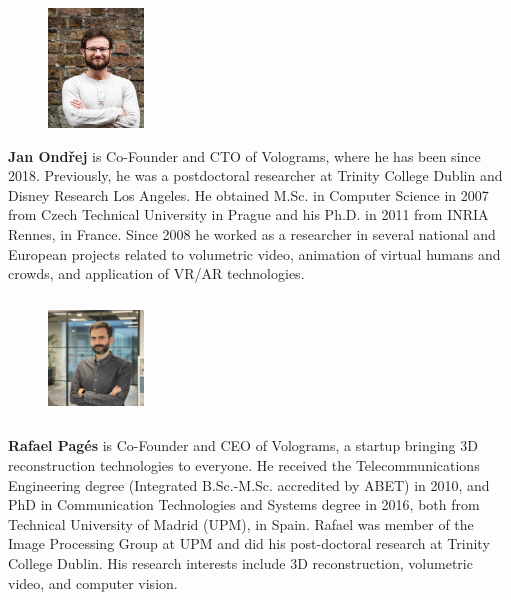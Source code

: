 \setlength\intextsep{0pt} %
\begin{figure} 
    \includegraphics[width=1in,height=1.25in,clip,keepaspectratio]{illustrations/photo_jan.jpg}
\end{figure}\par
\noindent \textbf{Jan Ondřej} is Co-Founder and CTO of Volograms, where he has been since 2018. Previously, he was a postdoctoral researcher at Trinity College Dublin and Disney Research Los Angeles. He obtained M.Sc. in Computer Science in 2007 from Czech Technical University in Prague and his Ph.D. in 2011 from INRIA Rennes, in France. Since 2008 he worked as a researcher in several national and European projects related to volumetric video, animation of virtual humans and crowds, and application of VR/AR technologies.\\

\setlength\intextsep{0pt} %
\begin{figure} 
    \includegraphics[width=1in,height=1.25in,clip,keepaspectratio]{illustrations/photo_rafa.jpg}
\end{figure}\par
\noindent \textbf{Rafael Pagés} is Co-Founder and CEO of Volograms, a startup bringing 3D reconstruction technologies to everyone. He received the Telecommunications Engineering degree (Integrated B.Sc.-M.Sc. accredited by ABET) in 2010, and PhD in Communication Technologies and Systems degree in 2016, both from Technical University of Madrid (UPM), in Spain. Rafael was member of the Image Processing Group at UPM and did his post-doctoral research at Trinity College Dublin. His research interests include 3D reconstruction, volumetric video, and computer vision.\\


